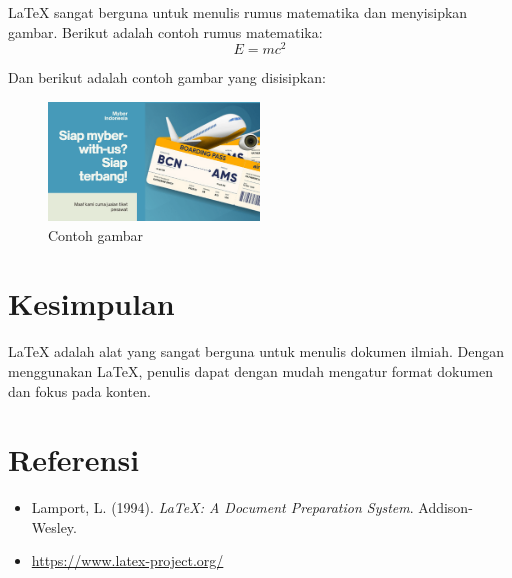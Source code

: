 \documentclass[a4paper,12pt]{report}
\begin{document}
LaTeX sangat berguna untuk menulis rumus matematika dan menyisipkan gambar. Berikut adalah contoh rumus matematika:
\begin{equation}
E = mc^2
\end{equation}

Dan berikut adalah contoh gambar yang disisipkan:
\begin{figure}[h]
    \centering
    \includegraphics[width=0.5\textwidth]{../assets/banner.png}
    \caption{Contoh gambar}
    \label{fig:example}
\end{figure}



\section{Kesimpulan}
LaTeX adalah alat yang sangat berguna untuk menulis dokumen ilmiah. Dengan menggunakan LaTeX, penulis dapat dengan mudah mengatur format dokumen dan fokus pada konten.

\section*{Referensi}
\begin{itemize}
    \item Lamport, L. (1994). \textit{LaTeX: A Document Preparation System}. Addison-Wesley.
    \item \url{https://www.latex-project.org/}
\end{itemize}
\end{document}
